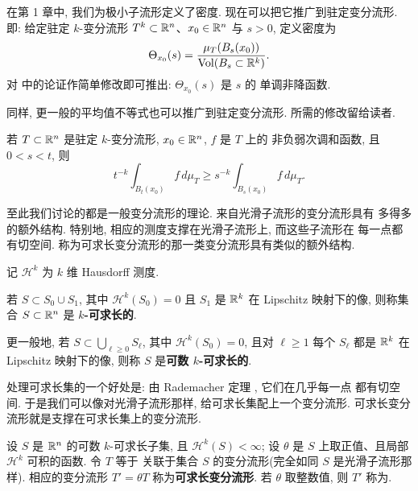 在第 1 章中, 我们为极小子流形定义了密度. 现在可以把它推广到驻定变分流形.
即: 给定驻定 $k$-变分流形 $T^k\subset\mathbb{R}^n$、$x_0\in\mathbb{R}^n$ 与 $s>0$,
定义密度为
\begin{equation}
\Theta_{x_0}(s)=\frac{\mu_T(B_s(x_0))}{\operatorname{Vol}(B_s\subset\mathbb{R}^k)}.
\label{eq:3.34}
\end{equation}
对 中的论证作简单修改即可推出: $\Theta_{x_0}(s)$ 是 $s$ 的
单调非降函数.

同样, 更一般的平均值不等式也可以推广到驻定变分流形. 所需的修改留给读者.

\begin{proposition}[驻定变分流形的平均值不等式]
\label{prop:3.8}
若 $T\subset\mathbb{R}^n$ 是驻定 $k$-变分流形, $x_0\in\mathbb{R}^n$, $f$ 是 $T$ 上的
非负弱次调和函数, 且 $0<s<t$, 则
\begin{equation}
t^{-k}\int_{B_t(x_0)}f\,d\mu_T
 \geq s^{-k}\int_{B_s(x_0)}f\,d\mu_T.
\label{eq:3.35}
\end{equation}
\end{proposition}

至此我们讨论的都是一般变分流形的理论. 来自光滑子流形的变分流形具有
多得多的额外结构. 特别地, 相应的测度支撑在光滑子流形上, 而这些子流形在
每一点都有切空间. 称为可求长变分流形的那一类变分流形具有类似的额外结构.

记 $\mathcal{H}^k$ 为 $k$ 维 Hausdorff 测度.

\begin{definition}
\label{def:3.9}
若 $S\subset S_0\cup S_1$, 其中 $\mathcal{H}^k(S_0)=0$ 且 $S_1$ 是
$\mathbb{R}^k$ 在 Lipschitz 映射下的像, 则称集合 $S\subset\mathbb{R}^n$ 是
\textbf{$k$-可求长的}.

更一般地, 若 $S\subset\bigcup_{\ell\geq0}S_\ell$, 其中
$\mathcal{H}^k(S_0)=0$, 且对 $\ell\geq1$ 每个 $S_\ell$ 都是 $\mathbb{R}^k$ 在
Lipschitz 映射下的像, 则称 $S$ 是\textbf{可数 $k$-可求长的}.
\end{definition}

处理可求长集的一个好处是: 由 Rademacher 定理 \cite{Fe}, 它们在几乎每一点
都有切空间. 于是我们可以像对光滑子流形那样, 给可求长集配上一个变分流形.
可求长变分流形就是支撑在可求长集上的变分流形.

\begin{definition}[可求长变分流形]
\label{def:3.10}
设 $S$ 是 $\mathbb{R}^n$ 的可数 $k$-可求长子集, 且 $\mathcal{H}^k(S)<\infty$;
设 $\theta$ 是 $S$ 上取正值、且局部 $\mathcal{H}^k$ 可积的函数. 令 $T$ 等于
关联于集合 $S$ 的变分流形(完全如同 $S$ 是光滑子流形那样). 相应的变分流形
$T'=\theta T$ 称为\textbf{可求长变分流形}. 若 $\theta$ 取整数值, 则 $T'$
称为.
\end{definition}

